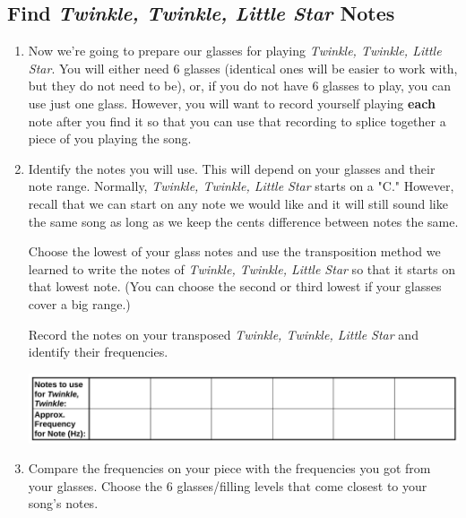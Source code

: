 \documentclass[12pt,noauthor,nooutcomes,hints,instructornotes]{ximera}%
\begin{document}
\subsection{Find \textit{Twinkle, Twinkle, Little Star} Notes}
\begin{enumerate}
    \item Now we're going to prepare our glasses for playing \textit{Twinkle, Twinkle, Little Star}.  You will either need 6 glasses (identical ones will be easier to work with, but they do not need to be), or, if you do not have 6 glasses to play, you can use just one glass.  However, you will want to record yourself playing \textbf{each} note after you find it so that you can use that recording to splice together a piece of you playing the song.
    
    \item Identify the notes you will use.  This will depend on your glasses and their note range.  Normally, \textit{Twinkle, Twinkle, Little Star} starts on a "C."  However, recall that we can start on any note we would like and it will still sound like the same song as long as we keep the cents difference between notes the same.  
    
    Choose the lowest of your glass notes and use the transposition method we learned to write the notes of \textit{Twinkle, Twinkle, Little Star} so that it starts on that lowest note. (You can choose the second or third lowest if your glasses cover a big range.)
    
    Record the notes on your transposed \textit{Twinkle, Twinkle, Little Star} and identify their frequencies.
    
    \includegraphics[width=\textwidth]{Projects/Twinkle-Freq.png}\\
    
    \item Compare the frequencies on your piece with the frequencies you got from your glasses. Choose the 6 glasses/filling levels that come closest to your song's notes.
    

\end{enumerate}
\end{document}

